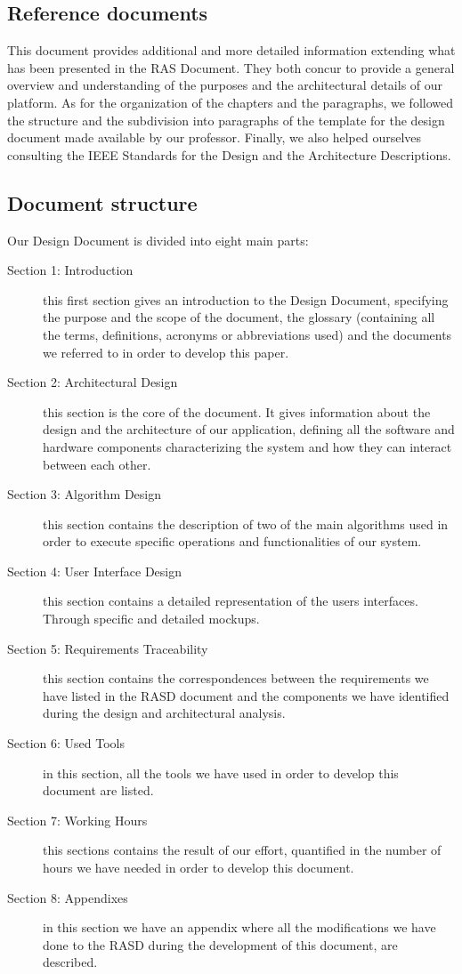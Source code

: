  
\subsection{Reference documents }
This document provides additional and more detailed information extending what has been
presented in the RAS Document. They both concur to provide a general overview and understanding
of the purposes and the architectural details of our platform.
As for the organization of the chapters and the paragraphs, we followed the structure and the 
subdivision into paragraphs of the template for the design document made available by our professor. 
Finally, we also helped ourselves consulting the IEEE Standards for the Design and the Architecture 
Descriptions. 
 
 
\subsection{Document structure}
Our Design Document is divided into eight main parts: 
\begin{description}
    \item[Section 1: Introduction]
        this first section gives an introduction to the Design Document, specifying the purpose and the 
        scope of the document, the glossary (containing all the terms, definitions, acronyms or 
        abbreviations used) and the documents we referred to in order to develop this paper. 
    \item[Section 2: Architectural Design]
        this section is the core of the document. It gives information about the design and the 
        architecture of our application, defining all the software and hardware components 
        characterizing the system and how they can interact between each other.
    \item[Section 3: Algorithm Design]
        this section contains the description of two of the main algorithms used in order to execute 
        specific operations and functionalities of our system. 
    \item[Section 4: User Interface Design]
        this section contains a detailed representation of the users interfaces. Through specific and 
        detailed mockups. 
    \item[Section 5: Requirements Traceability] 
        this section contains the correspondences between the requirements we have listed in the 
        RASD document and the components we have identified during the design and architectural 
        analysis. 
    \item[Section 6: Used Tools] 
        in this section, all the tools we have used in order to develop this document are listed. 
    \item[Section 7: Working Hours] 
        this sections contains the result of our effort, quantified in the number of hours we have 
        needed in order to develop this document. 
    \item[Section 8: Appendixes] 
        in this section we have an appendix where all the modifications we have done to the RASD 
        during the development of this document, are described. 
\end{description}
